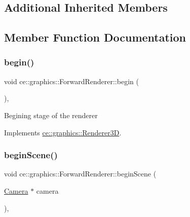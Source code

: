 \subsection*{Additional Inherited Members}


\subsection{Member Function Documentation}
\mbox{\label{classce_1_1graphics_1_1_forward_renderer_a4550120dc1349b5298de4a02422c6c26}} 
\subsubsection{\texorpdfstring{begin()}{begin()}}
{\footnotesize\ttfamily void ce\+::graphics\+::\+Forward\+Renderer\+::begin (\begin{DoxyParamCaption}{ }\end{DoxyParamCaption})\hspace{0.3cm}{\ttfamily [override]}, {\ttfamily [virtual]}}

Begining stage of the renderer 

Implements \hyperlink{classce_1_1graphics_1_1_renderer3_d_a51818b5b581c33001ddbbc6dff9d6e36}{ce\+::graphics\+::\+Renderer3D}.

\mbox{\label{classce_1_1graphics_1_1_forward_renderer_ae84dbf0b5a71b464cf4fc34a5daac805}} 
\subsubsection{\texorpdfstring{begin\+Scene()}{beginScene()}}
{\footnotesize\ttfamily void ce\+::graphics\+::\+Forward\+Renderer\+::begin\+Scene (\begin{DoxyParamCaption}\item[{\hyperlink{classce_1_1graphics_1_1_camera}{Camera} $\ast$}]{camera }\end{DoxyParamCaption})\hspace{0.3cm}{\ttfamily [override]}, {\ttfamily [virtual]}}

